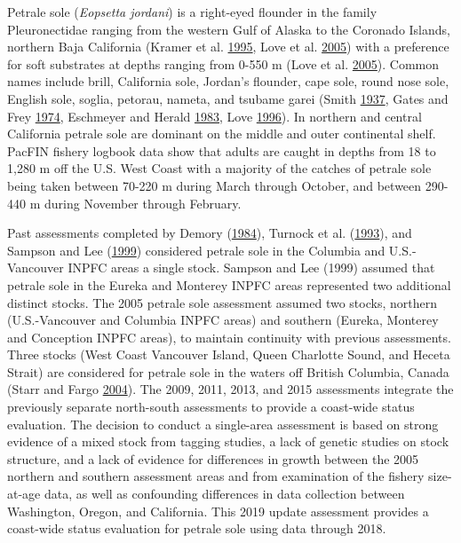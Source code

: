\documentclass[12pt,]{article}
\begin{document}
Petrale sole (\emph{Eopsetta jordani}) is a right-eyed flounder in the
family Pleuronectidae ranging from the western Gulf of Alaska to the
Coronado Islands, northern Baja California (Kramer et al.
\protect\hyperlink{ref-kramer_guide_1995}{1995}, Love et al.
\protect\hyperlink{ref-love_milton_resource_2005}{2005}) with a
preference for soft substrates at depths ranging from 0-550 m (Love et
al. \protect\hyperlink{ref-love_milton_resource_2005}{2005}). Common
names include brill, California sole, Jordan's flounder, cape sole,
round nose sole, English sole, soglia, petorau, nameta, and tsubame
garei (Smith \protect\hyperlink{ref-smith_report_1937}{1937}, Gates and
Frey \protect\hyperlink{ref-gates_designated_1974}{1974}, Eschmeyer and
Herald \protect\hyperlink{ref-eschmeyer_field_1983}{1983}, Love
\protect\hyperlink{ref-love_milton_probably_1996}{1996}). In northern
and central California petrale sole are dominant on the middle and outer
continental shelf. PacFIN fishery logbook data show that adults are
caught in depths from 18 to 1,280 m off the U.S. West Coast with a
majority of the catches of petrale sole being taken between 70-220 m
during March through October, and between 290-440 m during November
through February.

Past assessments completed by Demory
(\protect\hyperlink{ref-demory_progress_1984}{1984}), Turnock et al.
(\protect\hyperlink{ref-turnock_status_1993}{1993}), and Sampson and Lee
(\protect\hyperlink{ref-sampson_assessment_1999}{1999}) considered
petrale sole in the Columbia and U.S.-Vancouver INPFC areas a single
stock. Sampson and Lee (1999) assumed that petrale sole in the Eureka
and Monterey INPFC areas represented two additional distinct stocks. The
2005 petrale sole assessment assumed two stocks, northern
(U.S.-Vancouver and Columbia INPFC areas) and southern (Eureka, Monterey
and Conception INPFC areas), to maintain continuity with previous
assessments. Three stocks (West Coast Vancouver Island, Queen Charlotte
Sound, and Heceta Strait) are considered for petrale sole in the waters
off British Columbia, Canada (Starr and Fargo
\protect\hyperlink{ref-starr_petrale_2004}{2004}). The 2009, 2011, 2013,
and 2015 assessments integrate the previously separate north-south
assessments to provide a coast-wide status evaluation. The decision to
conduct a single-area assessment is based on strong evidence of a mixed
stock from tagging studies, a lack of genetic studies on stock
structure, and a lack of evidence for differences in growth between the
2005 northern and southern assessment areas and from examination of the
fishery size-at-age data, as well as confounding differences in data
collection between Washington, Oregon, and California. This 2019 update
assessment provides a coast-wide status evaluation for petrale sole
using data through 2018.
\end{document}
